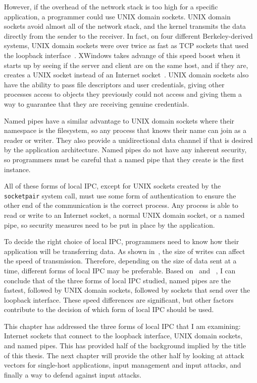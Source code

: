 However, if the overhead of the network stack is too high for a specific application, a programmer could use UNIX domain sockets.  UNIX domain sockets avoid almost all of the network stack, and the kernel transmits the data directly from the sender to the receiver.  In fact, on four different Berkeley-derived systems, UNIX domain sockets were over twice as fast as TCP sockets that used the loopback interface~\cite[p 223--224]{Stevens:1997:UNP:522800}.  XWindows takes advange of this speed boost when it starts up by seeing if the server and client are on the same host, and if they are, creates a UNIX socket instead of an Internet socket~\cite[p 373]{Stevens:1997:UNP:522800}.  UNIX domain sockets also have the ability to pass file descriptors and user credentials, giving other processes access to objects they previously could not access and giving them a way to guarantee that they are receiving genuine credentials.

Named pipes have a similar advantage to UNIX domain sockets where their namespace is the filesystem, so any process that knows their name can join as a reader or writer.  They also provide a unidirectional data channel if that is desired by the application architecture.  Named pipes do not have any inherent security, so programmers must be careful that a named pipe that they create is the first instance.

All of these forms of local IPC, except for UNIX sockets created by the \texttt{socketpair} system call, must use some form of authentication to ensure the other end of the communication is the correct process.  Any process is able to read or write to an Internet socket, a normal UNIX domain socket, or a named pipe, so security measures need to be put in place by the application.

To decide the right choice of local IPC, programmers need to know how their application will be transferring data.  As shown in~\cite{Xiurong2011TheAA}, the size of writes can affect the speed of transmission.  Therefore, depending on the size of data sent at a time, different forms of local IPC may be preferable.  Based on~\cite{immich2003performance} and ~\cite{Stevens:1997:UNP:522800}, I can conclude that of the three forms of local IPC studied, named pipes are the fastest, followed by UNIX domain sockets, followed by sockets that send over the loopback interface.  These speed differences are significant, but other factors contribute to the decision of which form of local IPC should be used.

This chapter has addressed the three forms of local IPC that I am examining: Internet sockets that connect to the loopback interface, UNIX domain sockets, and named pipes.  This has provided half of the background implied by the title of this thesis.  The next chapter will provide the other half by looking at attack vectors for single-host applications, input management and input attacks, and finally a way to defend against input attacks.
